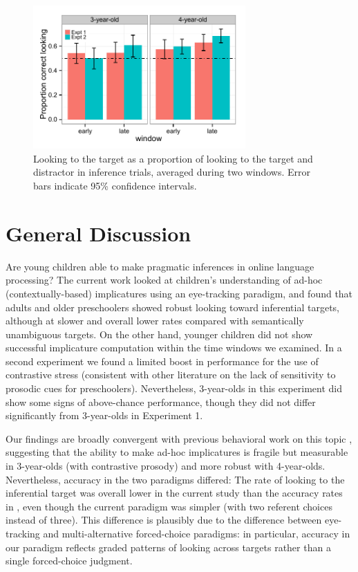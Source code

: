 \documentclass[10pt,letterpaper]{article}
\begin{document}
\begin{figure}[h!]
\begin{center} 
\includegraphics[width=3.2in]{figures/expt12-accuracy_split.pdf}
\caption{\label{fig:0prosbar} Looking to the target as a proportion of looking to the target and distractor in inference trials, averaged during two windows. Error bars indicate 95\% confidence intervals.}
\end{center} 
\end{figure}

\section{General Discussion}

Are young children able to make pragmatic inferences in online language processing? The current work looked at children's understanding of ad-hoc (contextually-based) implicatures using an eye-tracking paradigm, and found that adults and older preschoolers showed robust looking toward inferential targets, although at slower and overall lower rates compared with semantically unambiguous targets. On the other hand, younger children did not show successful implicature computation within the time windows we examined. In a second experiment we found a limited boost in performance for the use of contrastive stress (consistent with other literature on the lack of sensitivity to prosodic cues for preschoolers). Nevertheless, 3-year-olds in this experiment did show some signs of above-chance performance, though they did not differ significantly from 3-year-olds in Experiment 1.  

Our findings are broadly convergent with previous behavioral work on this topic \cite{stillerLLD}, suggesting that the ability to make ad-hoc implicatures is fragile but measurable in 3-year-olds (with contrastive prosody) and more robust with 4-year-olds. Nevertheless, accuracy in the two paradigms differed: The rate of looking to the inferential target was overall lower in the current study than the accuracy rates in , even though the current paradigm was simpler (with two referent choices instead of three). This difference is plausibly due to the difference between eye-tracking and multi-alternative forced-choice paradigms: in particular, accuracy in our paradigm reflects graded patterns of looking across targets rather than a single forced-choice judgment.
\end{document}
